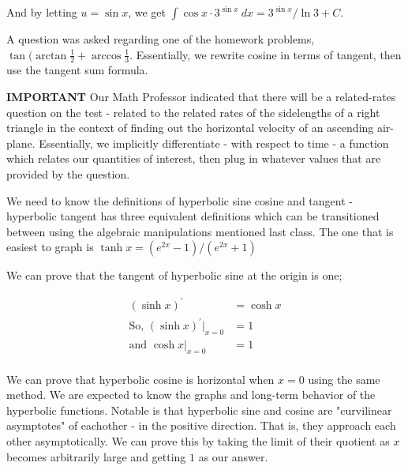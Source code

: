 \documentclass{article}
\begin{document}
\vspace{10pt}

And by letting $u=\sin x$, we get $\int\cos x\cdot3^{\sin x}\ dx=3^{\sin x}/\ln3+C$.

\vspace{10pt}

A question was asked regarding one of the homework problems, $\tan(\arctan\frac{1}{2}+\arccos\frac{1}{3}$. Essentially, we rewrite cosine in terms of tangent, then use the tangent sum formula.

\vspace{10pt}

{\bf{}IMPORTANT} Our Math Professor indicated that there will be a related-rates question on the test - related to the related rates of the sidelengths of a right triangle in the context of finding out the horizontal velocity of an ascending air-plane. Essentially, we implicitly differentiate - with respect to time - a function which relates our quantities of interest, then plug in whatever values that are provided by the question.

\vspace{10pt}

We need to know the definitions of hyperbolic sine cosine and tangent - hyperbolic tangent has three equivalent definitions which can be transitioned between using the algebraic manipulations mentioned last class. The one that is easiest to graph is $\tanh x=(e^{2x}-1)/(e^{2x}+1)$

\vspace{10pt}

We can prove that the tangent of hyperbolic sine at the origin is one;

\begin{align*}
(\sinh x)^\prime&=\cosh x\\
\mbox{So, }(\sinh x)^\prime\big|_{x=0}&=1\\
\mbox{and }\cosh x\big|_{x=0}&=1\\
\end{align*}

\vspace{10pt}

We can prove that hyperbolic cosine is horizontal when $x=0$ using the same method. We are expected to know the graphs and long-term behavior of the hyperbolic functions. Notable is that hyperbolic sine and cosine are "curvilinear asymptotes" of eachother - in the positive direction. That is, they approach each other asymptotically. We can prove this by taking the limit of their quotient as $x$ becomes arbitrarily large and getting $1$ as our answer.
\end{document}
